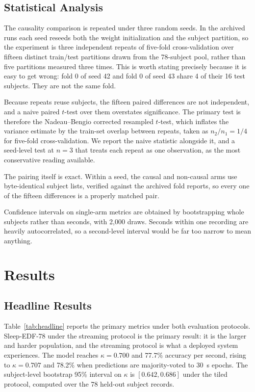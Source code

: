 \documentclass[conference]{IEEEtran}
\begin{document}
\subsection{Statistical Analysis}

The causality comparison is repeated under three random seeds. In the archived runs each seed reseeds
both the weight initialization and the subject partition, so the experiment is three independent
repeats of five-fold cross-validation over fifteen distinct train/test partitions drawn from the
78-subject pool, rather than five partitions measured three times. This is worth stating precisely
because it is easy to get wrong: fold 0 of seed 42 and fold 0 of seed 43 share 4 of their 16 test
subjects. They are not the same fold.

Because repeats reuse subjects, the fifteen paired differences are not independent, and a naive
paired $t$-test over them overstates significance. The primary test is therefore the
Nadeau--Bengio corrected resampled $t$-test, which inflates the variance estimate by the train-set
overlap between repeats, taken as $n_2/n_1 = 1/4$ for five-fold cross-validation. We report the naive
statistic alongside it, and a seed-level test at $n = 3$ that treats each repeat as one observation,
as the most conservative reading available.

The pairing itself is exact. Within a seed, the causal and non-causal arms use byte-identical subject
lists, verified against the archived fold reports, so every one of the fifteen differences is a
properly matched pair.

Confidence intervals on single-arm metrics are obtained by bootstrapping whole subjects rather than
seconds, with 2{,}000 draws. Seconds within one recording are heavily autocorrelated, so a
second-level interval would be far too narrow to mean anything.

\section{Results}

\subsection{Headline Results}

Table~\ref{tab:headline} reports the primary metrics under both evaluation protocols. Sleep-EDF-78
under the streaming protocol is the primary result: it is the larger and harder population, and the
streaming protocol is what a deployed system experiences. The model reaches $\kappa = 0.700$ and
77.7\% accuracy per second, rising to $\kappa = 0.707$ and 78.2\% when predictions are majority-voted
to 30~s epochs. The subject-level bootstrap 95\% interval on $\kappa$ is $[0.642, 0.686]$ under the
tiled protocol, computed over the 78 held-out subject records.
\end{document}
